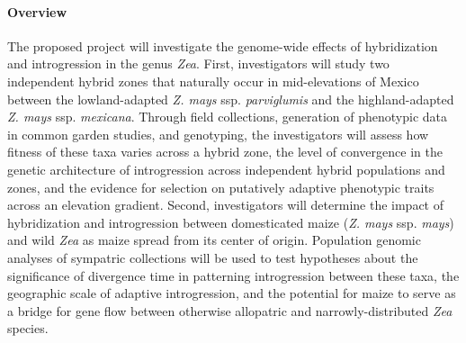 
%
%
%
%
%
%

\paragraph{Overview} The proposed project will investigate the genome-wide effects of hybridization and introgression in the genus \emph{Zea}.  First, investigators will study two independent hybrid zones that naturally occur in mid-elevations of Mexico between the lowland-adapted \emph{Z. mays} ssp. \emph{parviglumis} and the highland-adapted \emph{Z. mays} ssp. \emph{mexicana}.  Through field collections, generation of phenotypic data in common garden studies, and genotyping, the investigators will assess how fitness of these taxa varies across a hybrid zone, the level of convergence in the genetic architecture of introgression across independent hybrid populations and zones, and the evidence for selection on putatively adaptive phenotypic traits across an elevation gradient. Second, investigators will determine the impact of hybridization and introgression between domesticated maize (\emph{Z. mays} ssp. \emph{mays}) and wild  \emph{Zea} as maize spread from its center of origin. Population genomic analyses of sympatric collections will be used to test hypotheses about the significance of divergence time in patterning introgression between these taxa, the geographic scale of adaptive introgression, and the potential for maize to serve as a bridge for gene flow between otherwise allopatric and narrowly-distributed \emph{Zea} species.

